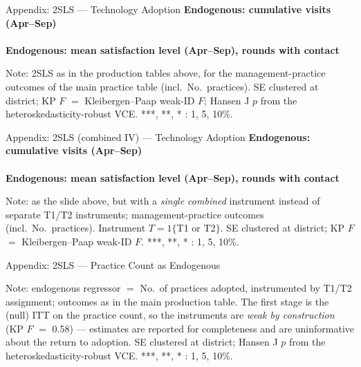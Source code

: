 \documentclass[aspectratio=169]{beamer}
\newcommand{\notefont}{\fontsize{5pt}{6pt}\selectfont}
\begin{document}
\begin{frame}{Appendix: 2SLS --- Technology Adoption}
	\centering
	{\notefont\textbf{Endogenous: cumulative visits (Apr--Sep)}}\\[1pt]
	\\[4pt]
	{\notefont\textbf{Endogenous: mean satisfaction level (Apr--Sep), rounds with contact}}\\[1pt]
	\begin{minipage}{0.94\textwidth}
		\notefont
		Note: 2SLS as in the production tables above, for the management-practice outcomes
		of the main practice table (incl.\ No.\ practices). SE clustered at district; KP $F$ $=$
		Kleibergen--Paap weak-ID $F$; Hansen J $p$ from the heteroskedasticity-robust VCE.
		***, **, * : 1, 5, 10\%.
	\end{minipage}
\end{frame}

\begin{frame}{Appendix: 2SLS (combined IV) --- Technology Adoption}
	\centering
	{\notefont\textbf{Endogenous: cumulative visits (Apr--Sep)}}\\[1pt]
	\\[4pt]
	{\notefont\textbf{Endogenous: mean satisfaction level (Apr--Sep), rounds with contact}}\\[1pt]
	\begin{minipage}{0.94\textwidth}
		\notefont
		Note: as the slide above, but with a \emph{single combined} instrument instead of
		separate T1/T2 instruments; management-practice outcomes (incl.\ No.\ practices).
		Instrument $T = 1\{$T1 or T2$\}$. SE clustered at district;
		KP $F$ $=$ Kleibergen--Paap weak-ID $F$.
		***, **, * : 1, 5, 10\%.
	\end{minipage}
\end{frame}

\begin{frame}{Appendix: 2SLS --- Practice Count as Endogenous}
	\centering
	\begin{minipage}{0.94\textwidth}
		\notefont
		Note: endogenous regressor $=$ No.\ of practices adopted, instrumented by T1/T2
		assignment; outcomes as in the main production table. The first stage is the (null) ITT
		on the practice count, so the instruments are \emph{weak by construction} (KP $F$ $=$
		0.58) --- estimates are reported for completeness and are uninformative about the return
		to adoption. SE clustered at district; Hansen J $p$ from the heteroskedasticity-robust
		VCE. ***, **, * : 1, 5, 10\%.
	\end{minipage}
\end{frame}
\end{document}
